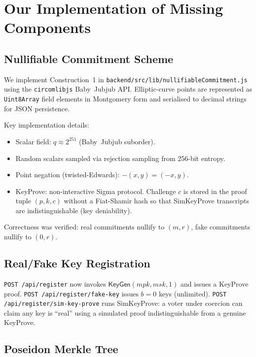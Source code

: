 \documentclass[conference]{IEEEtran}
\begin{document}
\section{Our Implementation of Missing Components}
\label{sec:impl}

\subsection{Nullifiable Commitment Scheme}

We implement Construction~1 in \texttt{backend/src/lib/nullifiableCommitment.js}
using the \texttt{circomlibjs} Baby~Jubjub API.  Elliptic-curve points are
represented as \texttt{Uint8Array} field elements in Montgomery form and
serialised to decimal strings for JSON persistence.

Key implementation details:
\begin{itemize}
  \item Scalar field: $q \approx 2^{251}$ (Baby~Jubjub suborder).
  \item Random scalars sampled via rejection sampling from 256-bit entropy.
  \item Point negation (twisted-Edwards): $-(x,y) = (-x, y)$.
  \item \textsf{KeyProve}: non-interactive Sigma protocol.  Challenge $c$ is
    stored in the proof tuple $(p, k, c)$ without a Fiat-Shamir hash so that
    \textsf{SimKeyProve} transcripts are indistinguishable (key deniability).
\end{itemize}

Correctness was verified: real commitments nullify to $(m,r)$, fake
commitments nullify to $(0,r)$.

\subsection{Real/Fake Key Registration}

\texttt{POST /api/register} now invokes $\mathsf{KeyGen}(\mathit{mpk},
\mathit{msk}, 1)$ and issues a KeyProve proof.
\texttt{POST /api/register/fake-key} issues $b=0$ keys (unlimited).
\texttt{POST /api/register/sim-key-prove} runs \textsf{SimKeyProve}: a voter
under coercion can claim any key is ``real'' using a simulated proof
indistinguishable from a genuine KeyProve.

\subsection{Poseidon Merkle Tree}
\end{document}
